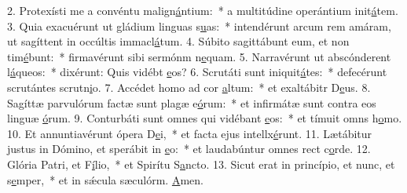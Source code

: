 2. Protexísti me a convéntu malign\uline{á}ntium:~* a multitúdine operántium init\uline{á}tem.
3. Quia exacuérunt ut gládium linguas s\uline{u}as:~* intendérunt arcum rem amáram, ut sagíttent in occúltis immacl\uline{á}tum.
4. Súbito sagittábunt eum, et non tim\uline{é}bunt:~* firmavérunt sibi sermónm n\uline{e}quam.
5. Narravérunt ut abscónderent l\uline{á}queos:~* dixérunt: Quis vidébt \uline{e}os?
6. Scrutáti sunt iniquit\uline{á}tes:~* defecérunt scrutántes scrutn\uline{i}o.
7. Accédet homo ad cor \uline{a}ltum:~* et exaltábitr D\uline{e}us.
8. Sagíttæ parvulórum factæ sunt plagæ e\uline{ó}rum:~* et infirmátæ sunt contra eos linguæ \uline{ó}rum.
9. Conturbáti sunt omnes qui vidébant \uline{e}os:~* et tímuit omns h\uline{o}mo.
10. Et annuntiavérunt ópera D\uline{e}i,~* et facta ejus intellx\uline{é}runt.
11. Lætábitur justus in Dómino, et sperábit in \uline{e}o:~* et laudabúntur omnes rect c\uline{o}rde.
12. Glória Patri, et F\uline{í}lio,~* et Spirítu S\uline{a}ncto.
13. Sicut erat in princípio, et nunc, et s\uline{e}mper,~* et in sǽcula sæculórm. \uline{A}men.
